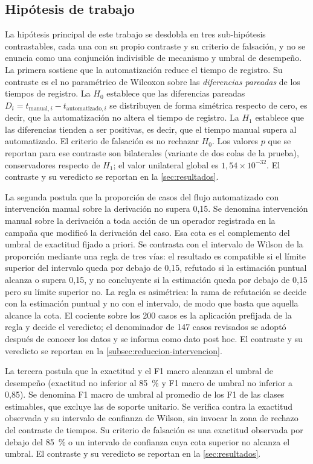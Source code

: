 \subsection{Hipótesis de trabajo}\label{subsec:hipotesis-trabajo}

La hipótesis principal de este trabajo se desdobla en tres sub-hipótesis contrastables, cada una con su propio contraste y su criterio de falsación, y no se enuncia como una conjunción indivisible de mecanismo y umbral de desempeño. La primera sostiene que la automatización reduce el tiempo de registro. Su contraste es el no paramétrico de Wilcoxon sobre las \emph{diferencias pareadas} de los tiempos de registro. La \(H_{0}\) establece que las diferencias pareadas \(D_{i} = t_{\text{manual},i} - t_{\text{automatizado},i}\) se distribuyen de forma simétrica respecto de cero, es decir, que la automatización no altera el tiempo de registro. La \(H_{1}\) establece que las diferencias tienden a ser positivas, es decir, que el tiempo manual supera al automatizado. El criterio de falsación es no rechazar \(H_{0}\). Los valores \(p\) que se reportan para ese contraste son bilaterales (variante de dos colas de la prueba), conservadores respecto de \(H_{1}\); el valor unilateral global es \(1{,}54 \times 10^{-32}\). El contraste y su veredicto se reportan en la \autoref{sec:resultados}.

La segunda postula que la proporción de casos del flujo automatizado con intervención manual sobre la derivación no supera 0,15. Se denomina intervención manual sobre la derivación a toda acción de un operador registrada en la campaña que modificó la derivación del caso. Esa cota es el complemento del umbral de exactitud fijado a priori. Se contrasta con el intervalo de Wilson de la proporción mediante una regla de tres vías: el resultado es compatible si el límite superior del intervalo queda por debajo de 0,15, refutado si la estimación puntual alcanza o supera 0,15, y no concluyente si la estimación queda por debajo de 0,15 pero su límite superior no. La regla es asimétrica: la rama de refutación se decide con la estimación puntual y no con el intervalo, de modo que basta que aquella alcance la cota. El cociente sobre los 200 casos es la aplicación prefijada de la regla y decide el veredicto; el denominador de 147 casos revisados se adoptó después de conocer los datos y se informa como dato post hoc. El contraste y su veredicto se reportan en la \autoref{subsec:reduccion-intervencion}.

La tercera postula que la exactitud y el F1 macro alcanzan el umbral de desempeño (exactitud no inferior al 85~\% y F1 macro de umbral no inferior a 0,85). Se denomina F1 macro de umbral al promedio de los F1 de las clases estimables, que excluye las de soporte unitario. Se verifica contra la exactitud observada y su intervalo de confianza de Wilson, sin invocar la zona de rechazo del contraste de tiempos. Su criterio de falsación es una exactitud observada por debajo del 85~\% o un intervalo de confianza cuya cota superior no alcanza el umbral. El contraste y su veredicto se reportan en la \autoref{sec:resultados}.

